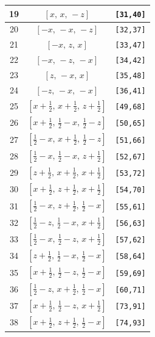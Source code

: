 \documentclass[fleqn,8pt]{jsarticle}
\begin{document}
\begin{longtable}{ccc}
19 & $\left[ x,\, x,\, - z \right]$ & {\tt [31,40]} \\ \hline
20 & $\left[ - x,\, - x,\, - z \right]$ & {\tt [32,37]} \\ \hline
21 & $\left[ - x,\, z,\, x \right]$ & {\tt [33,47]} \\ \hline
22 & $\left[ - x,\, - z,\, - x \right]$ & {\tt [34,42]} \\ \hline
23 & $\left[ z,\, - x,\, x \right]$ & {\tt [35,48]} \\ \hline
24 & $\left[ - z,\, - x,\, - x \right]$ & {\tt [36,41]} \\ \hline
25 & $\left[ x + \frac{1}{2},\, x + \frac{1}{2},\, z + \frac{1}{2} \right]$ & {\tt [49,68]} \\ \hline
26 & $\left[ x + \frac{1}{2},\, \frac{1}{2} - x,\, \frac{1}{2} - z \right]$ & {\tt [50,65]} \\ \hline
27 & $\left[ \frac{1}{2} - x,\, x + \frac{1}{2},\, \frac{1}{2} - z \right]$ & {\tt [51,66]} \\ \hline
28 & $\left[ \frac{1}{2} - x,\, \frac{1}{2} - x,\, z + \frac{1}{2} \right]$ & {\tt [52,67]} \\ \hline
29 & $\left[ z + \frac{1}{2},\, x + \frac{1}{2},\, x + \frac{1}{2} \right]$ & {\tt [53,72]} \\ \hline
30 & $\left[ x + \frac{1}{2},\, z + \frac{1}{2},\, x + \frac{1}{2} \right]$ & {\tt [54,70]} \\ \hline
31 & $\left[ \frac{1}{2} - x,\, z + \frac{1}{2},\, \frac{1}{2} - x \right]$ & {\tt [55,61]} \\ \hline
32 & $\left[ \frac{1}{2} - z,\, \frac{1}{2} - x,\, x + \frac{1}{2} \right]$ & {\tt [56,63]} \\ \hline
33 & $\left[ \frac{1}{2} - x,\, \frac{1}{2} - z,\, x + \frac{1}{2} \right]$ & {\tt [57,62]} \\ \hline
34 & $\left[ z + \frac{1}{2},\, \frac{1}{2} - x,\, \frac{1}{2} - x \right]$ & {\tt [58,64]} \\ \hline
35 & $\left[ x + \frac{1}{2},\, \frac{1}{2} - z,\, \frac{1}{2} - x \right]$ & {\tt [59,69]} \\ \hline
36 & $\left[ \frac{1}{2} - z,\, x + \frac{1}{2},\, \frac{1}{2} - x \right]$ & {\tt [60,71]} \\ \hline
37 & $\left[ x + \frac{1}{2},\, \frac{1}{2} - z,\, x + \frac{1}{2} \right]$ & {\tt [73,91]} \\ \hline
38 & $\left[ x + \frac{1}{2},\, z + \frac{1}{2},\, \frac{1}{2} - x \right]$ & {\tt [74,93]} \\ \hline

\end{longtable}
\end{document}
